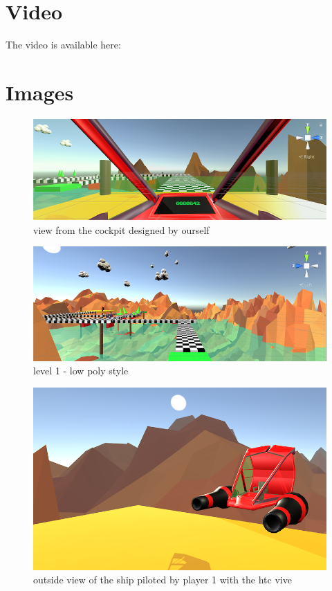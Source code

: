\documentclass[12pt]{article}
\begin{document}
\section{Video}
The video is available here: 

\newpage

\section{Images}
\begin{figure}[h]
   \caption{\label{étiquette} view from the cockpit designed by ourself}
   \includegraphics[scale=1]{images/cockpit.png}
\end{figure}

\begin{figure}[h]
   \caption{\label{étiquette} level 1 - low poly style}
   \includegraphics[scale=1]{images/level.png}
\end{figure}

\begin{figure}[!h]
   \caption{\label{étiquette} outside view of the ship piloted by player 1 with the htc vive}
   \includegraphics[scale=0.6]{images/ship.png}
\end{figure}
\end{document}

